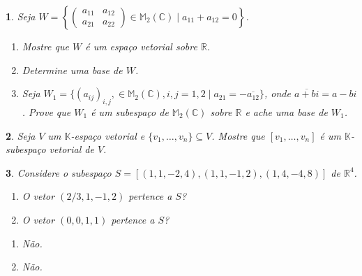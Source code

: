 \documentclass[12pt]{exam}
\newtheorem{exercicio}{}
\newcommand{\sub}{\subseteq}
\newcommand{\real}{\mathbb{R}}
\newcommand{\complex}{\mathbb{C}}
\newcommand{\cp}[1]{\mathbb{#1}}
\begin{document}
\begin{exercicio}
  Seja $W = \left\{\begin{pmatrix} a_{11} & a_{12}\\ a_{21} & a_{22}\end{pmatrix} \in \cp{M}_2(\complex) \mid a_{11} + a_{12} = 0\right\}$.
  \begin{enumerate}[label={\alph*})]
    \item Mostre que $W$ \'e um espa\c{c}o vetorial sobre $\real$.
    \item Determine uma base de $W$.
    \item Seja $W_1 = \{(a_{ij})_{i,j}, \in \cp{M}_2(\complex), i, j = 1, 2 \mid a_{21} = -\overline{a_{12}}\}$, onde $\overline{a + bi} = a - bi$. Prove que $W_1$ \'e um subespa\c{c}o de $\cp{M}_2(\complex)$ sobre $\real$ e ache uma base de $W_1$.
  \end{enumerate}
\end{exercicio}

\begin{exercicio}
  Seja $V$ um $\cp{K}$-espa\c{c}o vetorial e $\{v_1,\dots,v_n\} \sub V$. Mostre que $[v_1,\dots,v_n]$ \'e um $\cp{K}$-subespa\c{c}o vetorial de $V$.
\end{exercicio}

\begin{exercicio}
  Considere o subespa\c{c}o $S = [(1,1,-2,4),(1,1,-1,2),(1,4,-4,8)]$ de $\real^4$.
  \begin{enumerate}[label={\alph*})]
    \item O vetor $(2/3, 1, -1, 2)$ pertence a $S$?
    \item O vetor $(0, 0, 1, 1)$ pertence a $S$?
  \end{enumerate}
  \begin{solucao}
    \begin{enumerate}[label={\alph*})]
      \item N\~ao.
      \item N\~ao.
    \end{enumerate}
  \end{solucao}
\end{exercicio}
\end{document}
